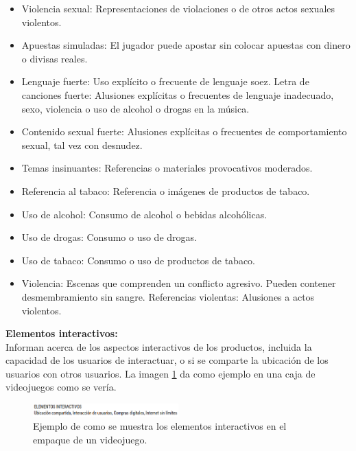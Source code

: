 \begin{itemize}
				\item Violencia sexual: Representaciones de violaciones o de otros actos sexuales violentos.
				\item Apuestas simuladas: El jugador puede apostar sin colocar apuestas con dinero o divisas reales.
				\item Lenguaje fuerte: Uso explícito o frecuente de lenguaje soez.
				Letra de canciones fuerte: Alusiones explícitas o frecuentes de lenguaje inadecuado, sexo, violencia o uso de alcohol o drogas en la música.
				\item Contenido sexual fuerte: Alusiones explícitas o frecuentes de comportamiento sexual, tal vez con desnudez.
				\item Temas insinuantes: Referencias o materiales provocativos moderados.
				\item Referencia al tabaco: Referencia o imágenes de productos de tabaco.
				\item Uso de alcohol: Consumo de alcohol o bebidas alcohólicas.
				\item Uso de drogas: Consumo o uso de drogas.
				\item Uso de tabaco: Consumo o uso de productos de tabaco.
				\item Violencia: Escenas que comprenden un conflicto agresivo. Pueden contener desmembramiento sin sangre.
				Referencias violentas: Alusiones a actos violentos.
			\end{itemize}
			
			\textbf{Elementos interactivos: } 
			\\[1pt]
			Informan acerca de los aspectos interactivos de los productos, incluida la capacidad de los usuarios de interactuar, o si se comparte la ubicación de los usuarios con otros usuarios. La imagen \ref{fig:clasInt} da como ejemplo en una caja de videojuegos como se vería. 
			\\[1pt]
			
				\begin{figure}
				\centering
				\includegraphics[width=0.5\textwidth]{03MarcoTeorico/imageR/clasInt}
				\caption{Ejemplo de como se muestra los elementos interactivos en el empaque de un videojuego.}
				\label{fig:clasInt}
				\end{figure}
			
